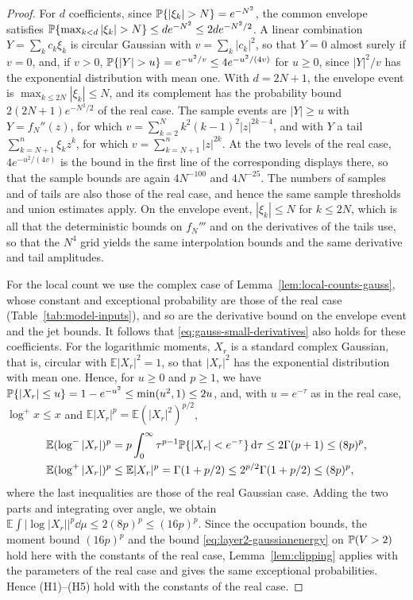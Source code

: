 \begin{proof}
For $d$ coefficients, since $\Prob\{|\xi_k|>N\}=e^{-N^2}$, the common
envelope satisfies
$\Prob\{\max_{k<d}|\xi_k|>N\}\le de^{-N^2}\le2de^{-N^2/2}$.
A linear combination $Y=\sum_kc_k\xi_k$ is circular Gaussian with
$v=\sum_k|c_k|^2$, so that $Y=0$ almost surely if $v=0$, and, if $v>0$,
$\Prob\{|Y|>u\}=e^{-u^2/v}\le4e^{-u^2/(4v)}$ for $u\ge0$, since
$|Y|^2/v$ has the exponential distribution with mean one.
With $d=2N+1$, the envelope event is $\max_{k\le2N}|\xi_k|\le N$, and
its complement has the probability bound $2(2N+1)e^{-N^2/2}$ of the real
case.
The sample events are $|Y|\ge u$ with $Y=f_N''(z)$, for which
$v=\sum_{k=2}^Nk^2(k-1)^2|z|^{2k-4}$, and with $Y$ a tail
$\sum_{k=N+1}^n\xi_kz^k$, for which $v=\sum_{k=N+1}^n|z|^{2k}$.
At the two levels of the real case, $4e^{-u^2/(4v)}$ is the bound in the
first line of the corresponding displays there, so that the sample bounds
are again $4N^{-100}$ and $4N^{-25}$.
The numbers of samples and of tails are also those of the real case, and
hence the same sample thresholds and union estimates apply.
On the envelope event, $|\xi_k|\le N$ for $k\le2N$, which is all that
the deterministic bounds on $f_N'''$ and on the derivatives of the tails
use, so that the $N^4$ grid yields the same interpolation
bounds and the same derivative and tail amplitudes.

For the local count we use the complex case of
Lemma~\ref{lem:local-counts-gauss}, whose constant and exceptional
probability are those of the real case (Table~\ref{tab:model-inputs}),
and so are the derivative bound on the envelope event and the jet
bounds.
It follows that \eqref{eq:gauss-small-derivatives} also holds
for these coefficients.
For the logarithmic moments, $X_r$ is a standard complex Gaussian, that
is, circular with $\mathbb E|X_r|^2=1$, so that $|X_r|^2$ has the
exponential distribution with mean one.
Hence, for $u\ge0$ and $p\ge1$, we have
$\mathbb P\{|X_r|\le u\}=1-e^{-u^2}\le\min(u^2,1)\le2u$, and, with
$u=e^{-\tau}$ as in the real case, $\log^+x\le x$ and
$\mathbb E|X_r|^p=\mathbb E(|X_r|^2)^{p/2}$,
\begin{align*}
 \mathbb E(\log^-|X_r|)^p
 &=p\int_0^\infty\tau^{p-1}\mathbb P\{|X_r|<e^{-\tau}\}\,\mathrm d\tau
 \le2\Gamma(p+1)
 \le(8p)^p,\\
 \mathbb E(\log^+|X_r|)^p
 &\le\mathbb E|X_r|^p
 =\Gamma(1+p/2)
 \le2^{p/2}\Gamma(1+p/2)
 \le(8p)^p,
\end{align*}
where the last inequalities are those of the real Gaussian case.
Adding the two parts and integrating over angle, we obtain
$\mathbb E\int|\log|X_r||^p\dd\mu\le2(8p)^p\le(16p)^p$.
Since the occupation bounds, the moment bound $(16p)^p$ and the bound
\eqref{eq:layer2-gaussianenergy} on $\mathbb P(V>2)$ hold here with the
constants of the real case, Lemma~\ref{lem:clipping} applies with the
parameters of the real case and gives the same exceptional
probabilities.
Hence (H1)--(H5) hold with the constants of the real case.


\end{proof}

